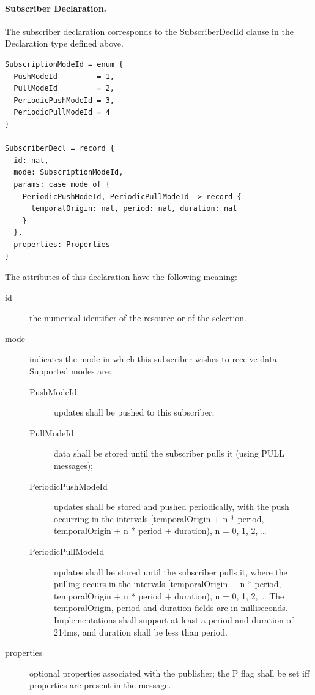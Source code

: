 \documentclass[a4paper,oneside,article]{memoir}
\begin{document}
\paragraph{Subscriber Declaration.} The subscriber declaration corresponds to the SubscriberDeclId
clause in the Declaration type defined above.
\begin{verbatim}
SubscriptionModeId = enum {
  PushModeId         = 1,
  PullModeId         = 2,
  PeriodicPushModeId = 3,
  PeriodicPullModeId = 4
}

SubscriberDecl = record {
  id: nat,
  mode: SubscriptionModeId,
  params: case mode of {
    PeriodicPushModeId, PeriodicPullModeId -> record {
      temporalOrigin: nat, period: nat, duration: nat
    }
  },
  properties: Properties
}
\end{verbatim}

The attributes of this declaration have the following meaning:
\begin{description}
\item[id] the numerical identifier of the resource or of the selection.
\item[mode] indicates the mode in which this subscriber wishes to receive data. Supported modes are:
  \begin{description}
  \item[PushModeId] updates shall be pushed to this subscriber;
  \item[PullModeId] data shall be stored until the subscriber pulls it (using PULL messages);
  \item[PeriodicPushModeId] updates shall be stored and pushed periodically, with the push occurring
    in the intervals [temporalOrigin + n * period, temporalOrigin + n * period + duration), n = 0,
    1, 2, …
  \item[PeriodicPullModeId] updates shall be stored until the subscriber pulls it, where the pulling
    occurs in the intervals [temporalOrigin + n * period, temporalOrigin + n * period + duration), n
    = 0, 1, 2, …  The temporalOrigin, period and duration fields are in
    milliseconds. Implementations shall support at least a period and duration of 214ms, and
    duration shall be less than period.
  \end{description}
\item[properties] optional properties associated with the publisher; the P flag shall be set iff
  properties are present in the message.
\end{description}
\end{document}
